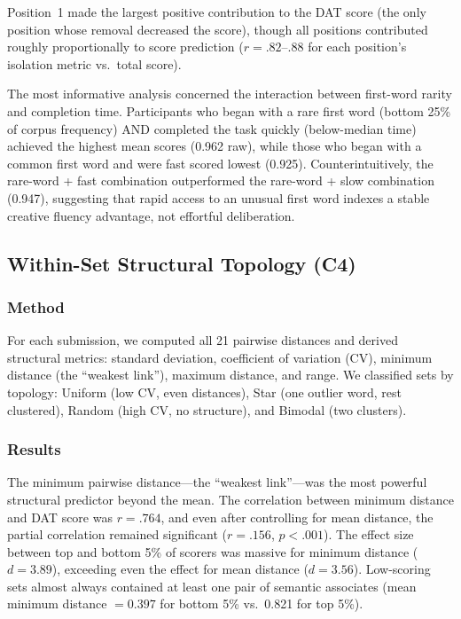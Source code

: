 \documentclass[12pt]{article}
\begin{document}
Position~1 made the largest positive contribution to the DAT score (the only position whose removal decreased the score), though all positions contributed roughly proportionally to score prediction ($r = .82$--.88 for each position's isolation metric vs.\ total score).

The most informative analysis concerned the interaction between first-word rarity and completion time. Participants who began with a rare first word (bottom 25\% of corpus frequency) AND completed the task quickly (below-median time) achieved the highest mean scores (0.962 raw), while those who began with a common first word and were fast scored lowest (0.925). Counterintuitively, the rare-word + fast combination outperformed the rare-word + slow combination (0.947), suggesting that rapid access to an unusual first word indexes a stable creative fluency advantage, not effortful deliberation.

\subsection{Within-Set Structural Topology (C4)}

\subsubsection{Method}

For each submission, we computed all 21 pairwise distances and derived structural metrics: standard deviation, coefficient of variation (CV), minimum distance (the ``weakest link''), maximum distance, and range. We classified sets by topology: Uniform (low CV, even distances), Star (one outlier word, rest clustered), Random (high CV, no structure), and Bimodal (two clusters).

\subsubsection{Results}

The minimum pairwise distance---the ``weakest link''---was the most powerful structural predictor beyond the mean. The correlation between minimum distance and DAT score was $r = .764$, and even after controlling for mean distance, the partial correlation remained significant ($r = .156$, $p < .001$). The effect size between top and bottom 5\% of scorers was massive for minimum distance ($d = 3.89$), exceeding even the effect for mean distance ($d = 3.56$). Low-scoring sets almost always contained at least one pair of semantic associates (mean minimum distance $= 0.397$ for bottom 5\% vs.\ 0.821 for top 5\%).
\end{document}
